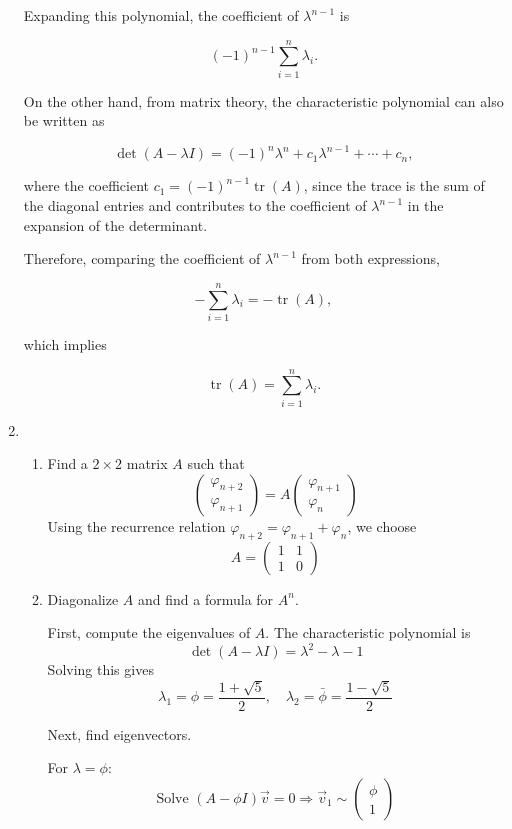\documentclass[12pt]{article}
\begin{document}
\begin{enumerate}
Expanding this polynomial, the coefficient of \( \lambda^{n-1} \) is

\[
(-1)^{n-1} \sum_{i=1}^n \lambda_i.
\]

On the other hand, from matrix theory, the characteristic polynomial can also be written as

\[
\det(A - \lambda I) = (-1)^n \lambda^n + c_1 \lambda^{n-1} + \cdots + c_n,
\]

where the coefficient \( c_1 = (-1)^{n-1} \operatorname{tr}(A) \), since the trace is the sum of the diagonal entries and contributes to the coefficient of \( \lambda^{n-1} \) in the expansion of the determinant.

Therefore, comparing the coefficient of \( \lambda^{n-1} \) from both expressions,

\[
- \sum_{i=1}^n \lambda_i = - \operatorname{tr}(A),
\]

which implies

\[
\operatorname{tr}(A) = \sum_{i=1}^n \lambda_i.
\]

\item 
\begin{enumerate}
    \item Find a $2 \times 2$ matrix $A$ such that
    \[
    \begin{pmatrix}
    \varphi_{n+2} \\
    \varphi_{n+1}
    \end{pmatrix}
    =
    A
    \begin{pmatrix}
    \varphi_{n+1} \\
    \varphi_n
    \end{pmatrix}
    \]
    Using the recurrence relation $\varphi_{n+2} = \varphi_{n+1} + \varphi_n$, we choose
    \[
    A = \begin{pmatrix}
    1 & 1 \\
    1 & 0
    \end{pmatrix}
    \]

    \item Diagonalize $A$ and find a formula for $A^n$.

    First, compute the eigenvalues of $A$. The characteristic polynomial is
    \[
    \det(A - \lambda I) = \lambda^2 - \lambda - 1
    \]
    Solving this gives
    \[
    \lambda_1 = \phi = \frac{1 + \sqrt{5}}{2}, \quad \lambda_2 = \bar{\phi} = \frac{1 - \sqrt{5}}{2}
    \]

    Next, find eigenvectors.

    For $\lambda = \phi$:
    \[
    \text{Solve } (A - \phi I)\vec{v} = 0 \Rightarrow
    \vec{v}_1 \sim \begin{pmatrix}
    \phi \\
    1
    \end{pmatrix}
    \]


\end{enumerate}
\end{enumerate}
\end{document}
